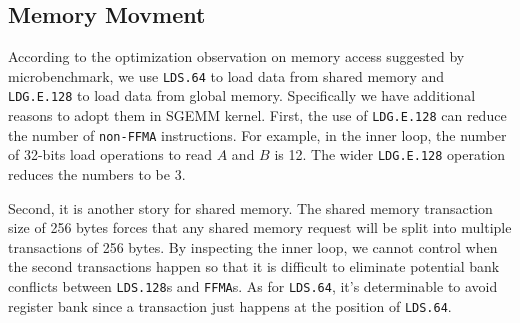 \subsection{Memory Movment}
According to the optimization observation on memory access suggested by microbenchmark, we use {\tt LDS.64} to load data from shared memory and {\tt LDG.E.128} to load data from global memory. Specifically we have additional reasons to adopt them in SGEMM kernel. First, the use of {\tt LDG.E.128} can reduce the number of {\tt non-FFMA} instructions. For example,  in the inner loop, the number of 32-bits load operations to read $A$ and $B$ is 12. The wider {\tt LDG.E.128} operation reduces the numbers to be 3.

Second, it is another story for shared memory. The shared memory transaction size of 256 bytes forces that any shared memory request will be split into multiple transactions of 256 bytes. By inspecting the inner loop, we cannot control when the second transactions happen so that it is difficult to eliminate potential bank conflicts between {\tt LDS.128}s and {\tt FFMA}s. As for {\tt LDS.64}, it's determinable to avoid register bank since a transaction just happens at the position of {\tt LDS.64}.

